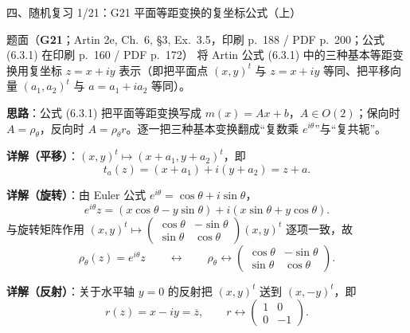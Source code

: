 \documentclass[aspectratio=169,10pt,fontset=none]{ctexbeamer}
\newcommand{\ex}[1]{\textcolor{accent}{\footnotesize\bfseries #1}}
\newcommand{\key}[1]{\textcolor{ink}{\bfseries #1}}
\begin{document}
\begin{frame}[t]{四、随机复习 1/21：G21 平面等距变换的复坐标公式（上）}
\label{ex:G21}
\scriptsize
\begin{block}{\footnotesize 题面（\ex{G21}；Artin 2e, Ch.~6, §3, Ex.~3.5，印刷 p.~188 / PDF p.~200；公式 (6.3.1) 在印刷 p.~160 / PDF p.~172）}
将 Artin 公式 (6.3.1) 中的三种基本等距变换用复坐标 $z=x+iy$ 表示（即把平面点 $(x,y)^t$ 与 $z=x+iy$ 等同、把平移向量 $(a_1,a_2)^t$ 与 $a=a_1+ia_2$ 等同）。
\end{block}
\key{思路}：公式 (6.3.1) 把平面等距变换写成 $m(x)=Ax+b$，$A\in O(2)$；保向时 $A=\rho_\theta$，反向时 $A=\rho_\theta r$。逐一把三种基本变换翻成“复数乘 $e^{i\theta}$”与“复共轭”。

\key{详解（平移）}：$(x,y)^t\mapsto(x+a_1,y+a_2)^t$，即
\[ t_a(z)=(x+a_1)+i(y+a_2)=z+a. \]

\key{详解（旋转）}：由 Euler 公式 $e^{i\theta}=\cos\theta+i\sin\theta$，
\[ e^{i\theta}z=(x\cos\theta-y\sin\theta)+i(x\sin\theta+y\cos\theta). \]
与旋转矩阵作用 $(x,y)^t\mapsto\begin{pmatrix}\cos\theta&-\sin\theta\\ \sin\theta&\cos\theta\end{pmatrix}(x,y)^t$ 逐项一致，故
\[ \rho_\theta(z)=e^{i\theta}z\qquad\longleftrightarrow\qquad \rho_\theta\leftrightarrow\begin{pmatrix}\cos\theta&-\sin\theta\\ \sin\theta&\cos\theta\end{pmatrix}. \]

\key{详解（反射）}：关于水平轴 $y=0$ 的反射把 $(x,y)^t$ 送到 $(x,-y)^t$，即
\[ r(z)=x-iy=\overline z,\qquad r\leftrightarrow\begin{pmatrix}1&0\\0&-1\end{pmatrix}. \]
\end{frame}
\end{document}
